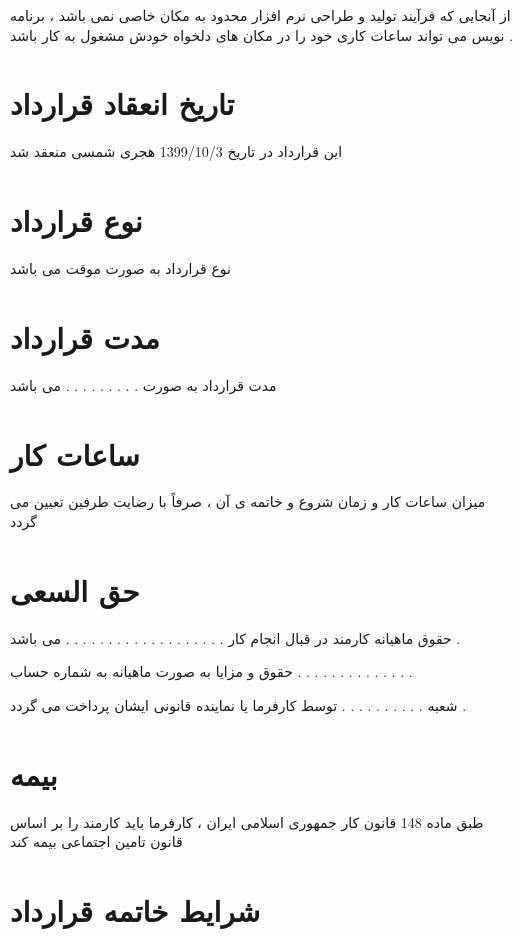 \documentclass[12pt]{article}
\begin{document}
از آنجایی که فرآیند تولید و طراحی نرم افزار محدود به مکان خاصی نمی باشد ، برنامه نویس می تواند ساعات کاری خود را در مکان های دلخواه خودش مشغول به کار باشد .


\section{تاریخ انعقاد قرارداد}

این قرارداد در تاریخ 1399/10/3 هجری شمسی منعقد شد

\section{نوع قرارداد}


نوع قرارداد به صورت موقت می باشد


\section{مدت قرارداد}


مدت قرارداد به صورت . . . . . . . . . می باشد


\section{ساعات کار}

میزان ساعات کار و زمان شروع و خاتمه ی آن ، صرفاً با رضایت طرفین تعیین می گردد


\section{حق السعی}

حقوق ماهیانه کارمند در قبال انجام کار . . . . . . . . . . . . . . . . . . . می باشد .

حقوق و مزایا به صورت ماهیانه به شماره حساب  . . . . . . . . . . . . . .

شعبه . . . . . . . . . . توسط کارفرما یا نماینده قانونی ایشان پرداخت می گردد .


\section{بیمه}

طبق ماده 148 قانون کار جمهوری اسلامی ایران ، کارفرما باید کارمند را بر اساس قانون تامین اجتماعی بیمه کند 




\section{شرایط خاتمه قرارداد}
\end{document}
